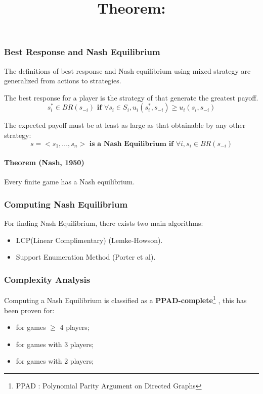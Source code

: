 \subsubsection{Best Response and Nash Equilibrium}The definitions of best response and Nash equilibrium using mixed strategy are generalized from actions to strategies. 
\begin{mydef}\label{def:def77} The best response for a player is the strategy of that generate the greatest payoff.
\begin{equation}\label{eq:111}
s_i^* \in BR(s_{-i}) \textbf{ if }   \forall s_i \in S_i, u_i(s_i^*,s_{-i}) \geq u_i(s_i, s_{-i})
\end{equation}
\end{mydef}
\begin{mydef}\label{def:def88} The expected payoff must be at least as large as that obtainable by any other strategy:
$$s = <s_1,...,s_n>\textbf{ is  a }\textbf{Nash Equilibrium if } \forall i, s_i \in BR(s_{-i})$$
\end{mydef}

\paragraph{Theorem (Nash, 1950)} Every finite game has a Nash equilibrium.

\subsubsection{Computing Nash Equilibrium}
For finding Nash Equilibrium, there exists two main algorithms:
\begin{itemize}
\item LCP(Linear Complimentary) (Lemke-Howson).
\item Support Enumeration Method (Porter et al).
\end{itemize}

\subsubsection{Complexity Analysis}
\title{\textbf{Theorem:}}
Computing a Nash Equilibrium is classified as a \textbf{PPAD-complete}\footnote{PPAD : Polynomial Parity Argument on Directed Graphs} , this has been proven for:
\begin{itemize}
\item for games $\geq$ 4 players;
\item for games with 3 players;
\item for games with 2 players;
\end{itemize}
